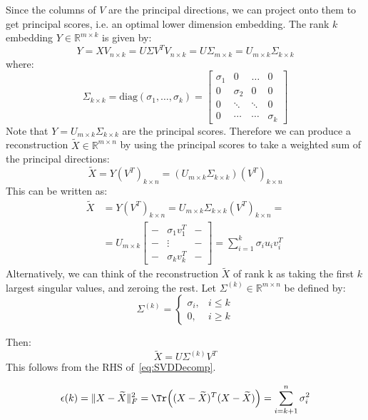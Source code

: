 \documentclass{article}
\begin{document}
\begin{theorem}
Since the columns of $V$ are the principal directions, we can project onto them to get principal scores, i.e. an optimal lower dimension embedding. The rank $k$ embedding $Y \in \mathbb{R}^{m \times k}$ is given by:
\[
Y = X V_{n \times  k} = U \Sigma V^{T} V_{n \times k} = U \Sigma_{m \times k} = U_{m \times k} \Sigma_{k \times k}
\]
where:
\[
 \Sigma_{k \times k}  = \text{diag}(\sigma_1, \ldots, \sigma_k) =  \begin{bmatrix} \sigma_1 & 0 & \ldots  & 0 \\ 0 & \sigma_2 & 0 & 0 \\ 0 & \ddots & \ddots & 0 \\ 0 & \cdots & \cdots & \sigma_k  \end{bmatrix}
\]
  Note that $Y = U_{m \times k} \Sigma_{k \times  k}$ are the principal scores. Therefore we can produce a reconstruction $\widetilde{X} \in \mathbb{R}^{m \times n}$ by using the principal scores to take a weighted sum of the principal directions:
\[
  \widetilde{X} = Y (V^{T})_{k \times n} =  (U_{m \times k}   \Sigma_{k \times k}) (V^{T})_{k \times n}
\]
This can be written as:
\begin{align} \label{eq:SVDDecomp}
  \widetilde{X} &= Y (V^{T})_{k \times n} = U_{m \times k} \Sigma_{k \times k} (V^{T})_{k \times n} = \\
  &= U_{m \times k} \begin{bmatrix} - & \sigma_1 v_1^{T} & - \\ - & \vdots & - \\ - & \sigma_k v_k^{T} & - \end{bmatrix} = \sum_{i=1}^{k} \sigma_i u_i v_i^{T}
\end{align}
 Alternatively, we can think of the reconstruction $\widetilde{X}$ of rank k as taking the first $k$ largest singular values, and zeroing the rest. Let $\Sigma^{(k)} \in \mathbb{R}^{m \times n}$ be defined by:
\[
  \Sigma^{(k)}  = \begin{cases} \sigma_i, & i \leq k \\ 0, & i \geq k \end{cases} 
\]

Then:
\[
  \widetilde{X} = U \Sigma^{(k)} V^{T}
\]
This follows from the RHS of~\cref{eq:SVDDecomp}. 

\end{theorem}

\begin{theorem}
  \[
    \epsilon(k) = \lVert X - \widetilde{X} \rVert_{F}^2 = \Tr \Big( (X - \widetilde{X})^{T} (X - \widetilde{X}) \Big) = \sum_{i=k+1}^{n} \sigma_i ^2
  \]
\end{theorem}
\end{document}
